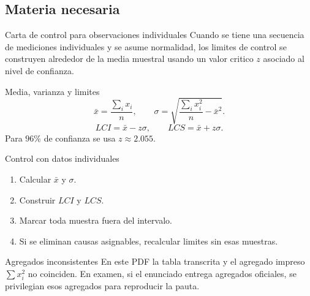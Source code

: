 \subsection{Materia necesaria}

\begin{definicion}{Carta de control para observaciones individuales}
Cuando se tiene una secuencia de mediciones individuales y se asume normalidad, los limites de control se construyen alrededor de la media muestral usando un valor critico \(z\) asociado al nivel de confianza.
\end{definicion}

\begin{formulas}{Media, varianza y limites}
\[
\bar x=\frac{\sum_i x_i}{n},\qquad
\sigma=\sqrt{\frac{\sum_i x_i^2}{n}-\bar x^2}.
\]
\[
LCI=\bar x-z\sigma,\qquad LCS=\bar x+z\sigma.
\]
Para \(96\%\) de confianza se usa \(z\approx 2.055\).
\end{formulas}

\begin{algoritmo}{Control con datos individuales}
\begin{enumerate}
    \item Calcular \(\bar x\) y \(\sigma\).
    \item Construir \(LCI\) y \(LCS\).
    \item Marcar toda muestra fuera del intervalo.
    \item Si se eliminan causas asignables, recalcular limites sin esas muestras.
\end{enumerate}
\end{algoritmo}

\begin{trampa}{Agregados inconsistentes}
En este PDF la tabla transcrita y el agregado impreso \(\sum x_i^2\) no coinciden. En examen, si el enunciado entrega agregados oficiales, se privilegian esos agregados para reproducir la pauta.
\end{trampa}
